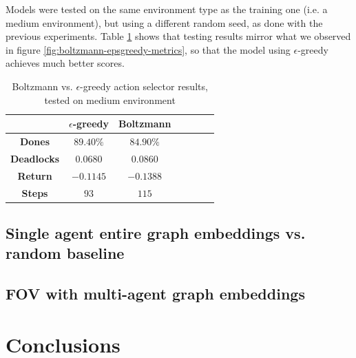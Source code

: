 \documentclass[a4paper,10pt]{report}
\begin{document}
Models were tested on the same environment type as the training one (i.e. a medium environment), but using a different random seed, as done with the previous experiments. Table \ref{table:bellman-operators-res} shows that testing results mirror what we observed in figure \ref{fig:boltzmann-epsgreedy-metrics}, so that the model using $\epsilon$-greedy achieves much better scores.  

\begin{table}[h]
	\center
	\begin{tabular}{|c|c|c|c|c|c|c|}
		\hline & \textbf{$\epsilon$-greedy} & \textbf{Boltzmann} \\ \hline
		\textbf{Dones}      & $89.40\%$ & $84.90\%$  \\ \hline
		\textbf{Deadlocks}  & $0.0680$ & $0.0860$ \\ \hline
		\textbf{Return}     & $-0.1145$ & $-0.1388$ \\ \hline
		\textbf{Steps}      & $93$ & $115$ \\ \hline
	\end{tabular}
	\caption{Boltzmann vs. $\epsilon$-greedy action selector results, tested on medium environment}
	\label{table:bellman-operators-res}
\end{table}

\section*{Single agent entire graph embeddings vs. random baseline}\label{sec:entire-graph-single-agent-res}

\section*{FOV with multi-agent graph embeddings}\label{sec:fov-dqn-gnn-robot-res}

\chapter{Conclusions}

\printbibliography
\end{document}
